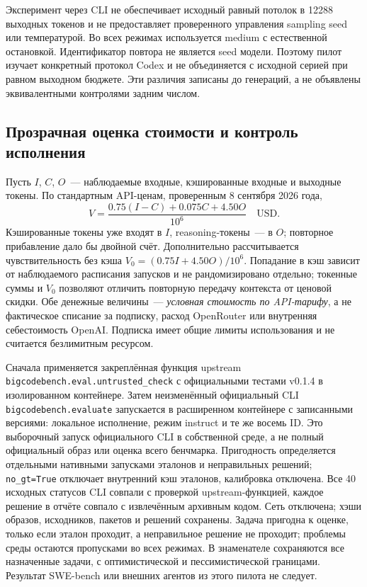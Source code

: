 Эксперимент через CLI не обеспечивает исходный равный потолок в 12288 выходных токенов и не предоставляет проверенного управления sampling seed или температурой. Во всех режимах используется medium с естественной остановкой. Идентификатор повтора не является seed модели. Поэтому пилот изучает конкретный протокол Codex и не объединяется с исходной серией при равном выходном бюджете. Эти различия записаны до генераций, а не объявлены эквивалентными контролями задним числом.

\subsection{Прозрачная оценка стоимости и контроль исполнения}
Пусть $I$, $C$, $O$~--- наблюдаемые входные, кэшированные входные и выходные токены. По стандартным API-ценам, проверенным 8 сентября 2026 года,
\begin{equation}
 V=\frac{0.75(I-C)+0.075C+4.50O}{10^6}\quad\mathrm{USD}.
\end{equation}
Кэшированные токены уже входят в $I$, reasoning-токены~--- в $O$; повторное прибавление дало бы двойной счёт. Дополнительно рассчитывается чувствительность без кэша $V_0=(0.75I+4.50O)/10^6$. Попадание в кэш зависит от наблюдаемого расписания запусков и не рандомизировано отдельно; токенные суммы и $V_0$ позволяют отличить повторную передачу контекста от ценовой скидки. Обе денежные величины~--- \emph{условная стоимость по API-тарифу}, а не фактическое списание за подписку, расход OpenRouter или внутренняя себестоимость OpenAI. Подписка имеет общие лимиты использования и не считается безлимитным ресурсом.

Сначала применяется закреплённая функция upstream \texttt{bigcodebench.eval.untrusted\_check} с официальными тестами v0.1.4 в изолированном контейнере. Затем неизменённый официальный CLI \texttt{bigcodebench.evaluate} запускается в расширенном контейнере с записанными версиями: локальное исполнение, режим instruct и те же восемь ID. Это выборочный запуск официального CLI в собственной среде, а не полный официальный образ или оценка всего бенчмарка. Пригодность определяется отдельными нативными запусками эталонов и неправильных решений; \texttt{no\_gt=True} отключает внутренний кэш эталонов, калибровка отключена. Все 40 исходных статусов CLI совпали с проверкой upstream-функцией, каждое решение в отчёте совпало с извлечённым архивным кодом. Сеть отключена; хэши образов, исходников, пакетов и решений сохранены. Задача пригодна к оценке, только если эталон проходит, а неправильное решение не проходит; проблемы среды остаются пропусками во всех режимах. В знаменателе сохраняются все назначенные задачи, с оптимистической и пессимистической границами. Результат SWE-bench или внешних агентов из этого пилота не следует.

